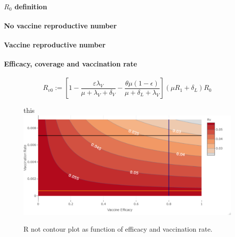 \paragraph{$R_0$ definition}
\paragraph{No  vaccine reproductive number}
\paragraph{Vaccine reproductive number}
\paragraph{Efficacy, coverage and vaccination rate}

%

\begin{equation*}
 R_{v0} := \left[ 1-\frac{\varepsilon \lambda_V}
 {\mu+\lambda_V+\delta_V}
 -\frac{\theta\mu(1-\epsilon)}{\mu+\delta_L+\lambda_V}\right]
 (\mu R_1+\delta_L)R_0
\end{equation*}
%
\begin{figure}[tbh]
    \centering
 this     \includegraphics[scale=0.565, keepaspectratio]{Figures/Rv_contour}
    \caption{R not contour plot as function of efficacy and vaccination rate.}
    \label{fig:rvcontour1}
\end{figure}




